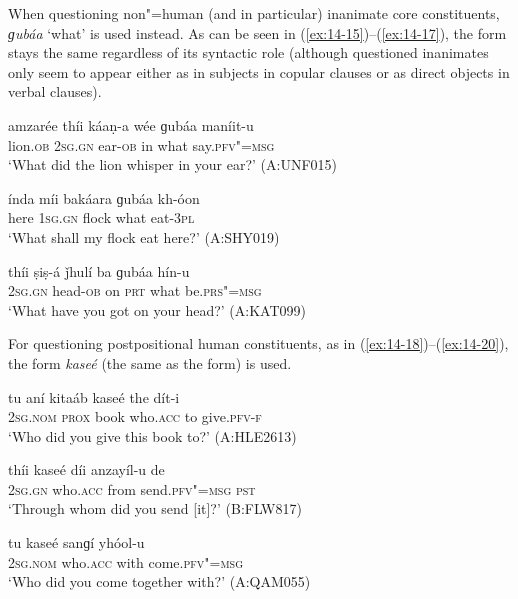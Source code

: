 When questioning non"=human (and in particular) inanimate core constituents, \textit{ɡubáa} `what' is used instead. As can be seen in (\ref{ex:14-15})--(\ref{ex:14-17}), the form stays the same regardless of its syntactic role (although questioned inanimates only seem to appear either as in subjects in copular clauses or as direct objects in verbal clauses).

\begin{exe}
\ex
\label{ex:14-15}
\gll amzarée thíi káaṇ-a wée ɡubáa maníit-u \\
lion.\textsc{ob} \textsc{2sg.gn} ear-\textsc{ob} in what say.\textsc{pfv"=msg} \\
\glt `What did the lion whisper in your ear?' (A:UNF015)

\ex
\label{ex:14-16}
\gll índa míi bakáara ɡubáa kh-óon \\
here \textsc{1sg.gn} flock what eat-\textsc{3pl} \\
\glt `What shall my flock eat here?' (A:SHY019)

\ex
\label{ex:14-17}
\gll thíi ṣiṣ-á ǰhulí ba ɡubáa hín-u \\
\textsc{2sg.gn} head-\textsc{ob} on \textsc{prt} what be.\textsc{prs"=msg} \\
\glt `What have you got on your head?' (A:KAT099)
\end{exe}

 For questioning postpositional human constituents, as in (\ref{ex:14-18})--(\ref{ex:14-20}), the  form \textit{kaseé} (the same as the  form) is used.

\begin{exe}
\ex
\label{ex:14-18}
\gll tu aní kitaáb kaseé the dít-i \\
\textsc{2sg.nom} \textsc{prox} book who.\textsc{acc} to give.\textsc{pfv-f} \\
\glt `Who did you give this book to?' (A:HLE2613)

\ex
\label{ex:14-19}
\gll thíi kaseé díi anzayíl-u de \\
\textsc{2sg.gn} who.\textsc{acc} from send.\textsc{pfv"=msg} \textsc{pst} \\
\glt `Through whom did you send [it]?' (B:FLW817)

\ex
\label{ex:14-20}
\gll tu kaseé sanɡí yhóol-u \\
\textsc{2sg.nom} who.\textsc{acc} with come.\textsc{pfv"=msg} \\
\glt `Who did you come together with?' (A:QAM055)
\end{exe}

